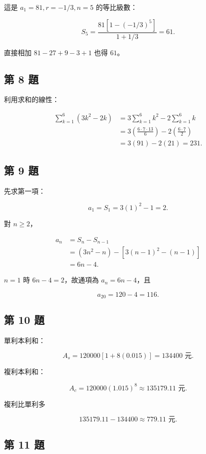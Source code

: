 \documentclass[11pt,a4paper]{article}
\begin{document}
這是 \(a_1=81,r=-1/3,n=5\) 的等比級數：

\[
S_5=\frac{81[1-(-1/3)^5]}{1+1/3}=61.
\]

直接相加 \(81-27+9-3+1\) 也得 \(61\)。

\subsection{第 8 題}\label{ux7b2c-8-ux984c}

利用求和的線性：

\[
\begin{aligned}
\sum_{k=1}^{6}(3k^2-2k)
&=3\sum_{k=1}^{6}k^2-2\sum_{k=1}^{6}k\\
&=3\left(\frac{6\cdot7\cdot13}{6}\right)
-2\left(\frac{6\cdot7}{2}\right)\\
&=3(91)-2(21)=231.
\end{aligned}
\]

\subsection{第 9 題}\label{ux7b2c-9-ux984c}

先求第一項：

\[
a_1=S_1=3(1)^2-1=2.
\]

對 \(n\ge2\)，

\[
\begin{aligned}
a_n&=S_n-S_{n-1}\\
&=(3n^2-n)-[3(n-1)^2-(n-1)]\\
&=6n-4.
\end{aligned}
\]

\(n=1\) 時 \(6n-4=2\)，故通項為 \(a_n=6n-4\)，且

\[
a_{20}=120-4=116.
\]

\subsection{第 10 題}\label{ux7b2c-10-ux984c}

單利本利和：

\[
A_s=120000[1+8(0.015)]=134400\text{ 元}.
\]

複利本利和：

\[
A_c=120000(1.015)^8\approx135179.11\text{ 元}.
\]

複利比單利多

\[
135179.11-134400\approx779.11\text{ 元}.
\]

\subsection{第 11 題}\label{ux7b2c-11-ux984c}
\end{document}
